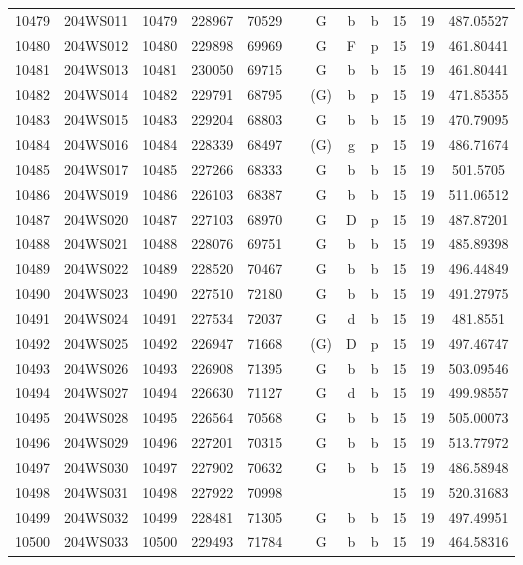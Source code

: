 \begin{tabular}{|*{12}{c|}}
10479 & 204WS011 & 10479 & 228967 & 70529 &  & G & b & b & 15 & 19 & 487.05527 \\ 
10480 & 204WS012 & 10480 & 229898 & 69969 &  & G & F & p & 15 & 19 & 461.80441 \\ 
10481 & 204WS013 & 10481 & 230050 & 69715 &  & G & b & b & 15 & 19 & 461.80441 \\ 
10482 & 204WS014 & 10482 & 229791 & 68795 &  & (G) & b & p & 15 & 19 & 471.85355 \\ 
10483 & 204WS015 & 10483 & 229204 & 68803 &  & G & b & b & 15 & 19 & 470.79095 \\ 
10484 & 204WS016 & 10484 & 228339 & 68497 &  & (G) & g & p & 15 & 19 & 486.71674 \\ 
10485 & 204WS017 & 10485 & 227266 & 68333 &  & G & b & b & 15 & 19 & 501.5705 \\ 
10486 & 204WS019 & 10486 & 226103 & 68387 &  & G & b & b & 15 & 19 & 511.06512 \\ 
10487 & 204WS020 & 10487 & 227103 & 68970 &  & G & D & p & 15 & 19 & 487.87201 \\ 
10488 & 204WS021 & 10488 & 228076 & 69751 &  & G & b & b & 15 & 19 & 485.89398 \\ 
10489 & 204WS022 & 10489 & 228520 & 70467 &  & G & b & b & 15 & 19 & 496.44849 \\ 
10490 & 204WS023 & 10490 & 227510 & 72180 &  & G & b & b & 15 & 19 & 491.27975 \\ 
10491 & 204WS024 & 10491 & 227534 & 72037 &  & G & d & b & 15 & 19 & 481.8551 \\ 
10492 & 204WS025 & 10492 & 226947 & 71668 &  & (G) & D & p & 15 & 19 & 497.46747 \\ 
10493 & 204WS026 & 10493 & 226908 & 71395 &  & G & b & b & 15 & 19 & 503.09546 \\ 
10494 & 204WS027 & 10494 & 226630 & 71127 &  & G & d & b & 15 & 19 & 499.98557 \\ 
10495 & 204WS028 & 10495 & 226564 & 70568 &  & G & b & b & 15 & 19 & 505.00073 \\ 
10496 & 204WS029 & 10496 & 227201 & 70315 &  & G & b & b & 15 & 19 & 513.77972 \\ 
10497 & 204WS030 & 10497 & 227902 & 70632 &  & G & b & b & 15 & 19 & 486.58948 \\ 
10498 & 204WS031 & 10498 & 227922 & 70998 &  &  &  &  & 15 & 19 & 520.31683 \\ 
10499 & 204WS032 & 10499 & 228481 & 71305 &  & G & b & b & 15 & 19 & 497.49951 \\ 
10500 & 204WS033 & 10500 & 229493 & 71784 &  & G & b & b & 15 & 19 & 464.58316 \\ 

\end{tabular}
